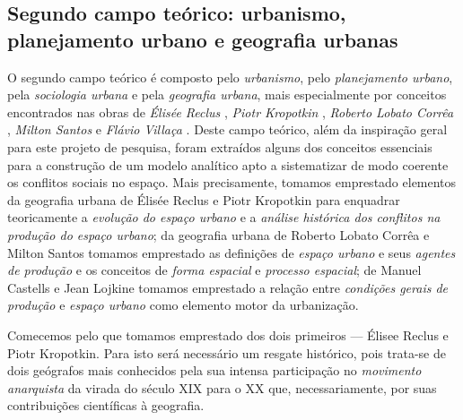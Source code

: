 \subsection[Segundo campo teórico: urbanismo, planejamento urbano e geografia urbana]{Segundo campo teórico: urbanismo, planejamento urbano e geografia urbanas}
\label{subsec:sociogeogrurb}

O segundo campo teórico é composto pelo \textit{urbanismo}, pelo \textit{planejamento urbano}, pela \textit{sociologia urbana} e pela \textit{geografia urbana}, mais especialmente por conceitos encontrados nas obras de \textit{Élisée Reclus} \cite{RECLUS1905a, reclus_renovacao_2010, RECLUS1905e}, \textit{Piotr Kropotkin} \cite{KROPOTKIN1955, KROPOTKIN2005f, KROPOTKIN2009}, \textit{Roberto Lobato Corrêa} \cite{CORREA1985espa, CORREA1997}, \textit{Milton Santos} \cite{santos_espmetodo_2008, SANTOS2008, santos_totallugar_2008, santos_ecopolcid_2009} e \textit{Flávio Villaça} \cite{villaca_intraurbano_2017}. Deste campo teórico, além da inspiração geral para este projeto de pesquisa, foram extraídos alguns dos conceitos essenciais para a construção de um modelo analítico apto a sistematizar de modo coerente os conflitos sociais no espaço. Mais precisamente, tomamos emprestado elementos da geografia urbana de Élisée Reclus e Piotr Kropotkin  para enquadrar teoricamente a \textit{evolução do espaço urbano} e a \textit{análise histórica dos conflitos na produção do espaço urbano}; da geografia urbana de Roberto Lobato Corrêa e Milton Santos tomamos emprestado as definições de \textit{espaço urbano} e seus \textit{agentes de produção} e os conceitos de \textit{forma espacial} e \textit{processo espacial}; de Manuel Castells e Jean Lojkine tomamos emprestado a relação entre \textit{condições gerais de produção} e \textit{espaço urbano} como elemento motor da urbanização.

Comecemos pelo que tomamos emprestado dos dois primeiros --- Élisee Reclus e Piotr Kropotkin. Para isto será necessário um resgate histórico, pois trata-se de dois geógrafos mais conhecidos pela sua intensa participação no \textit{movimento anarquista} da virada do século XIX para o XX que, necessariamente, por suas contribuições científicas à geografia.

